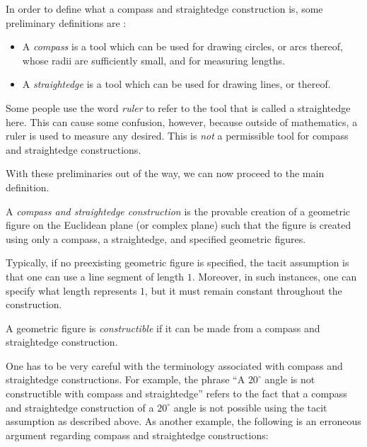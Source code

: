 \documentclass[12pt]{article}
\begin{document}

In order to define what a compass and straightedge construction is, some preliminary definitions are :

\begin{itemize}
\item A \emph{compass} is a tool which can be used for drawing circles, or arcs thereof, whose radii are sufficiently small, and for measuring lengths.
\item A \emph{straightedge} is a tool which can be used for drawing lines, or  thereof.
\end{itemize}

Some people use the word \emph{ruler} to refer to the tool that is called a straightedge here.  This can cause some confusion, however, because outside of mathematics, a ruler is used to measure any  desired.  This is \emph{not} a permissible tool for compass and straightedge constructions.

With these preliminaries out of the way, we can now proceed to the main definition.

A \emph{compass and straightedge construction} is the provable creation of a geometric figure on the Euclidean plane (or complex plane) such that the figure is created using only a compass, a straightedge, and specified geometric figures.

Typically, if no preexisting geometric figure is specified, the tacit assumption is that one can use a line segment of length $1$.  Moreover, in such instances, one can specify what length represents $1$, but it must remain constant throughout the construction.

A geometric figure is \emph{constructible} if it can be made from a compass and straightedge construction.

One has to be very careful with the terminology associated with compass and straightedge constructions.  For example, the phrase ``A $20^{\circ}$ angle is not constructible with compass and straightedge'' refers to the fact that a compass and straightedge construction of a $20^{\circ}$ angle is not possible using the tacit assumption as described above.  As another example, the following is an erroneous argument regarding compass and straightedge constructions:
\end{document}
